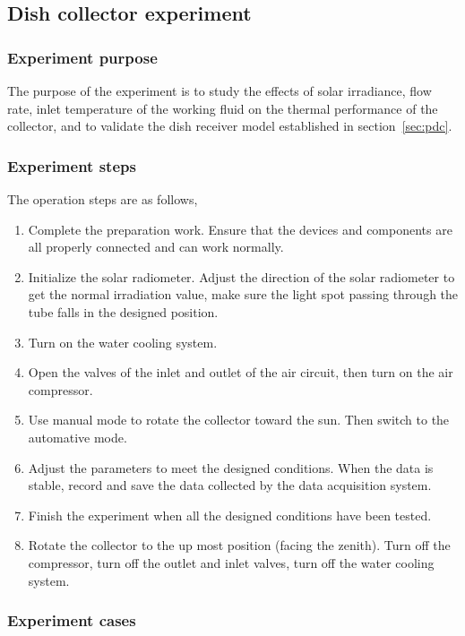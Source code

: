 \subsection{Dish collector experiment}
\subsubsection{Experiment purpose}
The purpose of the experiment is to study the effects of solar irradiance, flow rate, inlet temperature of the working fluid on the thermal performance of the collector, and to validate the dish receiver model established in section~\ref{sec:pdc}.

\subsubsection{Experiment steps}
 The operation steps are as follows,
\begin{enumerate}[label=(\arabic*)]
	\item Complete the preparation work. Ensure that the devices and components are all properly connected and can work normally.
	\item Initialize the solar radiometer. Adjust the direction of the solar radiometer to get the normal irradiation value, make sure the light spot passing through the tube falls in the designed position.
	\item Turn on the water cooling system.
	\item Open the valves of the inlet and outlet of the air circuit, then turn on the air compressor.
	\item Use manual mode to rotate the collector toward the sun. Then switch to the automative mode.
	\item Adjust the parameters to meet the designed conditions. When the data is stable, record and save the data collected by the data acquisition system.
	\item Finish the experiment when all the designed conditions have been tested. 
	\item Rotate the collector to the up most position (facing the zenith). Turn off the compressor, turn off the outlet and inlet valves, turn off the water cooling system.
\end{enumerate}

\subsubsection{Experiment cases}

